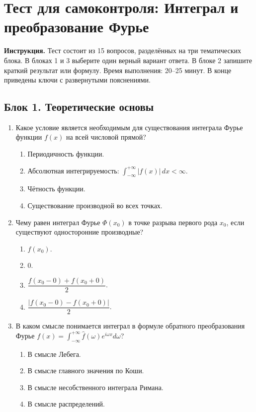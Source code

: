 \documentclass[12pt,a4paper]{article}
\begin{document}
\section*{Тест для самоконтроля: Интеграл и преобразование Фурье}

\textbf{Инструкция.} Тест состоит из 15 вопросов, разделённых на три тематических блока. В блоках 1 и 3 выберите один верный вариант ответа. В блоке 2 запишите краткий результат или формулу. Время выполнения: 20--25 минут. В конце приведены ключи с развернутыми пояснениями.

\subsection*{Блок 1. Теоретические основы}
\begin{enumerate}[label=\textbf{1.\arabic*.}]
    \item Какое условие является необходимым для существования интеграла Фурье функции $f(x)$ на всей числовой прямой?
    \begin{enumerate}[label=\alph*)]
        \item Периодичность функции.
        \item Абсолютная интегрируемость: $\int_{-\infty}^{+\infty} |f(x)| \, dx < \infty$.
        \item Чётность функции.
        \item Существование производной во всех точках.
    \end{enumerate}

    \item Чему равен интеграл Фурье $\Phi(x_0)$ в точке разрыва первого рода $x_0$, если существуют односторонние производные?
    \begin{enumerate}[label=\alph*)]
        \item $f(x_0)$.
        \item $0$.
        \item $\dfrac{f(x_0-0) + f(x_0+0)}{2}$.
        \item $\dfrac{|f(x_0-0) - f(x_0+0)|}{2}$.
    \end{enumerate}

    \item В каком смысле понимается интеграл в формуле обратного преобразования Фурье $f(x) = \int_{-\infty}^{+\infty} \hat{f}(\omega) e^{i\omega x} d\omega$?
    \begin{enumerate}[label=\alph*)]
        \item В смысле Лебега.
        \item В смысле главного значения по Коши.
        \item В смысле несобственного интеграла Римана.
        \item В смысле распределений.
    \end{enumerate}


\end{enumerate}
\end{document}
